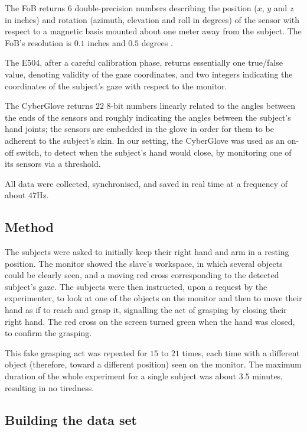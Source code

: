 \documentclass[a4paper,10pt,conference]{ieeeconf}
\begin{document}
The FoB returns $6$ double-precision numbers describing the position
($x$, $y$ and $z$ in inches) and rotation (azimuth, elevation and roll
in degrees) of the sensor with respect to a magnetic basis mounted
about one meter away from the subject. The FoB's resolution is $0.1$
inches and $0.5$ degrees \cite{fob}.

The E504, after a careful calibration phase, returns essentially one
true/false value, denoting validity of the gaze coordinates, and two
integers indicating the coordinates of the subject's gaze with respect
to the monitor.

The CyberGlove returns $22$ $8$-bit numbers linearly related to the
angles between the ends of the sensors and roughly indicating the
angles between the subject's hand joints; the sensors are embedded in
the glove in order for them to be adherent to the subject's skin. In
our setting, the CyberGlove was used as an on-off switch, to detect
when the subject's hand would close, by monitoring one of its sensors
via a threshold.

All data were collected, synchronised, and saved in real time at a
frequency of about $47$Hz.

\subsection{Method}

The subjects were asked to initially keep their right hand and arm in
a resting position. The monitor showed the slave's workspace, in which
several objects could be clearly seen, and a moving red cross
corresponding to the detected subject's gaze. The subjects were then
instructed, upon a request by the experimenter, to look at one of the
objects on the monitor and then to move their hand as if to reach and
grasp it, signalling the act of grasping by closing their right
hand. The red cross on the screen turned green when the hand was
closed, to confirm the grasping.

This fake grasping act was repeated for $15$ to $21$ times, each time
with a different object (therefore, toward a different position) seen
on the monitor. The maximum duration of the whole experiment for a
single subject was about $3.5$ minutes, resulting in no tiredness.

\subsection{Building the data set}
\label{subsec:dataset}
\end{document}

